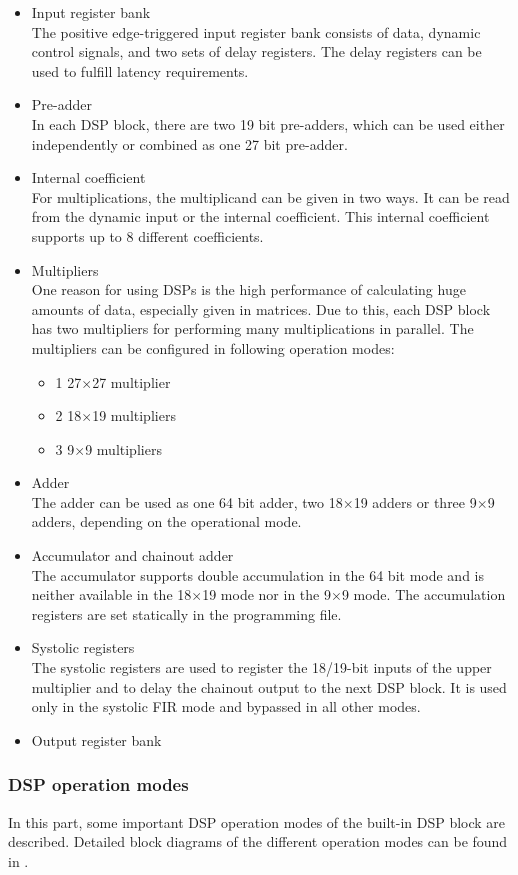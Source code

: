 \begin{itemize}
\item Input register bank\\
The positive edge-triggered input register bank consists of data, dynamic control signals, and two sets of delay registers. The delay registers can be used to fulfill latency requirements.
\item Pre-adder\\
In each DSP block, there are two 19 bit pre-adders, which can be used either independently or combined as one 27 bit pre-adder.
\item Internal coefficient\\
For multiplications, the multiplicand can be given in two ways. It can be read from the dynamic input or the internal coefficient. This internal coefficient supports up to 8 different coefficients.
\item Multipliers\\
One reason for using DSPs is the high performance of calculating huge amounts of data, especially given in matrices. Due to this, each DSP block has two multipliers for performing many multiplications in parallel. The multipliers can be configured in following operation modes:
\begin{itemize}
\item 1 27$\times$27 multiplier
\item 2 18$\times$19 multipliers
\item 3 9$\times$9 multipliers
\end{itemize}
\item Adder\\
The adder can be used as one 64 bit adder, two 18$\times$19 adders or three 9$\times$9 adders, depending on the operational mode.
\item Accumulator and chainout adder\\
The accumulator supports double accumulation in the 64 bit mode and is neither available in the 18$\times$19 mode nor in the 9$\times$9 mode. The accumulation registers are set statically in the programming file. 
\item Systolic registers\\
The systolic registers are used to register the 18/19-bit inputs of the upper multiplier and to delay the chainout output to the next DSP block. It is used only in the systolic FIR mode and bypassed in all other modes. 
\item Output register bank
\end{itemize}
\subsubsection{DSP operation modes}
In this part, some important DSP operation modes of the built-in DSP block are described. Detailed block diagrams of the different operation modes can be found in \cite[chapter 3]{AlteraFPGA15}.
